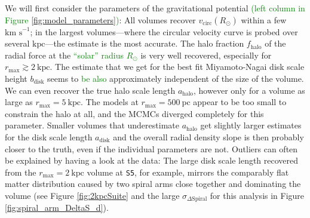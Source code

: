 \documentclass[iop,revtex4,numberedappendix,appendixfloats]{emulateapj}
\newcommand{\NEW}[1]{\textcolor{Green}{#1}}
\newcommand{\OLD}[1]{}
\begin{document}
We will first consider the parameters of the gravitational potential \NEW{(left column in Figure \ref{fig:model_parameters})}: All volumes recover $v_\text{circ}(R_\odot)$ within a few $\text{km s}^{-1}$; in the largest volumes---where the circular velocity curve is probed over several $\text{kpc}$---the estimate is the most accurate. The halo fraction $f_\text{halo}$ of the radial force at the \OLD{Sun}\NEW{``solar'' radius $R_\odot$} is very well recovered, especially for $r_\text{max}\gtrsim 2~\text{kpc}$. The estimate that we get for the best fit Miyamoto-Nagai disk scale height $b_\text{disk}$ seems to \OLD{also be}\NEW{be also} approximately independent of the size of the volume. We can even recover the true halo scale length $a_\text{halo}$, however only for a volume as large as $r_\text{max}=5~\text{kpc}$. The models at $r_\text{max}=500~\text{pc}$ appear to be too small to constrain the halo at all, and the MCMCs diverged completely for this parameter. Smaller volumes that underestimate $a_\text{halo}$ get slightly larger estimates for the disk scale length $a_\text{disk}$ and the overall radial density slope is then probably closer to the truth, even if the individual parameters are not. Outliers can often be explained by having a look at the data: The large disk scale length recovered from the $r_\text{max}=2~\text{kpc}$ volume at \texttt{S5}, for example, mirrors the comparably flat matter distribution caused by two spiral arms close together and dominating the volume (see Figure \ref{fig:2kpcSuite} and the large $\sigma_{\Delta\text{Spiral}}$ for this analysis in Figure \ref{fig:spiral_arm_DeltaS_d}). 
\end{document}
